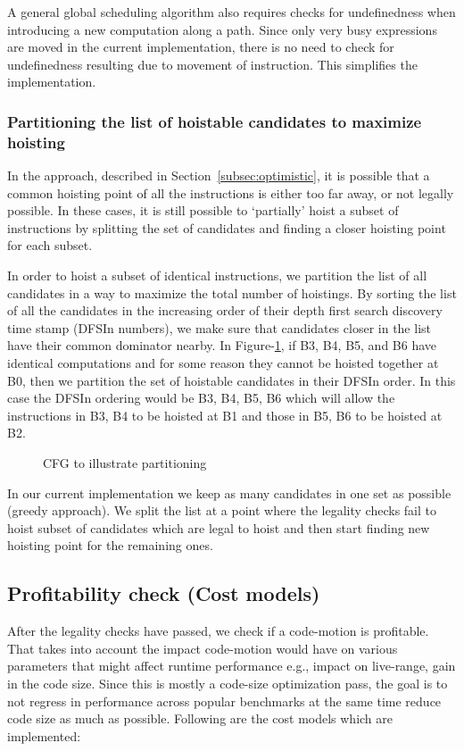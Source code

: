 \documentclass[acmlarge,review]{acmart}\settopmatter{printfolios=true}
\begin{document}
A general global scheduling algorithm also requires checks for undefinedness
when introducing a new computation along a path. Since only very busy
expressions are moved in the current implementation, there is no need to check
for undefinedness resulting due to movement of instruction. This simplifies the
implementation.

\subsubsection{Partitioning the list of hoistable candidates to maximize hoisting}
\label{subsec:partition}
In the approach, described in Section~\ref{subsec:optimistic}, it is possible
that a common hoisting point of all the instructions is either too far away, or
not legally possible. In these cases, it is still possible to `partially' hoist
a subset of instructions by splitting the set of candidates and finding a closer
hoisting point for each subset.

In order to hoist a subset of identical instructions, we partition the list of
all candidates in a way to maximize the total number of hoistings.  By sorting
the list of all the candidates in the increasing order of their depth first
search discovery time stamp \cite{clrs} (DFSIn numbers), we make sure that
candidates closer in the list have their common dominator nearby. In
Figure-\ref{fig:dfsin}, if B3, B4, B5, and B6 have identical computations and for
some reason they cannot be hoisted together at B0, then we partition the set of
hoistable candidates in their DFSIn order. In this case the DFSIn ordering would
be B3, B4, B5, B6 which will allow the instructions in B3, B4 to be hoisted at
B1 and those in B5, B6 to be hoisted at B2.

\begin{figure}
\centering
\caption{CFG to illustrate partitioning}
\label{fig:dfsin}
\end{figure}

In our current implementation we keep as many candidates in one set as possible
(greedy approach). We split the list at a point where the legality checks fail
to hoist subset of candidates which are legal to hoist and then start finding
new hoisting point for the remaining ones.


\subsection{Profitability check (Cost models)}
\label{sec:cost-models}
After the legality checks have passed, we check if a code-motion is profitable.
That takes into account the impact code-motion would have on various parameters
that might affect runtime performance e.g., impact on live-range, gain in the
code size. Since this is mostly a code-size optimization pass, the goal is to
not regress in performance across popular benchmarks at the same time reduce
code size as much as possible. Following are the cost models which are
implemented:
\end{document}
